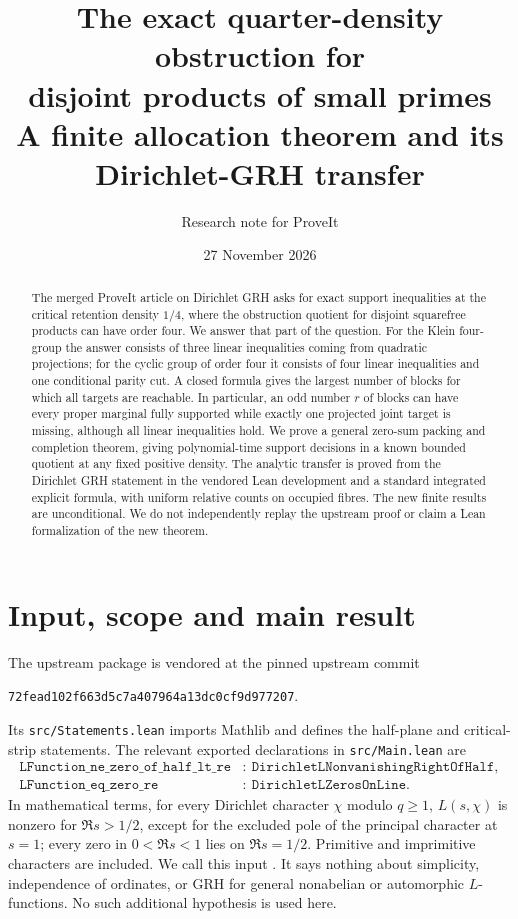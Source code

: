 \documentclass[11pt]{article}
\title{The exact quarter-density obstruction for\\disjoint products of small primes\vspace{3pt}\\\large A finite allocation theorem and its Dirichlet-GRH transfer}
\author{Research note for ProveIt}
\date{27 November 2026}
\theoremstyle{remark}\newtheorem{remark}[theorem]{Remark}
\begin{document}
\maketitle
\begin{abstract}
The merged ProveIt article on Dirichlet GRH asks for exact support inequalities at the critical retention density $1/4$, where the obstruction quotient for disjoint squarefree products can have order four. We answer that part of the question. For the Klein four-group the answer consists of three linear inequalities coming from quadratic projections; for the cyclic group of order four it consists of four linear inequalities and one conditional parity cut. A closed formula gives the largest number of blocks for which all targets are reachable. In particular, an odd number $r$ of blocks can have every proper marginal fully supported while exactly one projected joint target is missing, although all linear inequalities hold. We prove a general zero-sum packing and completion theorem, giving polynomial-time support decisions in a known bounded quotient at any fixed positive density. The analytic transfer is proved from the Dirichlet GRH statement in the vendored Lean development and a standard integrated explicit formula, with uniform relative counts on occupied fibres. The new finite results are unconditional. We do not independently replay the upstream proof or claim a Lean formalization of the new theorem.
\end{abstract}
\tableofcontents

\section{Input, scope and main result}
\label{sec:input}
The upstream package \cite{lean} is vendored at the pinned upstream commit
\begin{center}\texttt{72fead102f663d5c7a407964a13dc0cf9d977207}.\end{center}
Its \texttt{src/Statements.lean} imports Mathlib and defines the half-plane and critical-strip statements. The relevant exported declarations in \texttt{src/Main.lean} are
\begin{align*}
\texttt{LFunction\_ne\_zero\_of\_half\_lt\_re}&:\ \texttt{DirichletLNonvanishingRightOfHalf},\\
\texttt{LFunction\_eq\_zero\_re}&:\ \texttt{DirichletLZerosOnLine}.
\end{align*}
In mathematical terms, for every Dirichlet character $\chi$ modulo $q\ge1$, $L(s,\chi)$ is nonzero for $\Re s>1/2$, except for the excluded pole of the principal character at $s=1$; every zero in $0<\Re s<1$ lies on $\Re s=1/2$. Primitive and imprimitive characters are included. We call this input \DGRH. It says nothing about simplicity, independence of ordinates, or GRH for general nonabelian or automorphic $L$-functions. No such additional hypothesis is used here.
\end{document}
